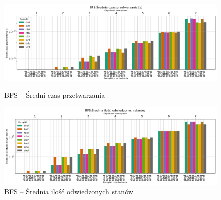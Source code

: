 \documentclass{classrep}
\begin{document}
\begin{figure}[H]
    \includegraphics[width=\textwidth]{charts/BFS_time.png}
    \caption{BFS -- Średni czas przetwarzania}
    \label{BFS:time}
    \includegraphics[width=\textwidth]{charts/BFS_visited.png}
    \caption{BFS -- Średnia ilość odwiedzonych stanów}
    \label{BFS:visited}
\end{figure}
\end{document}
